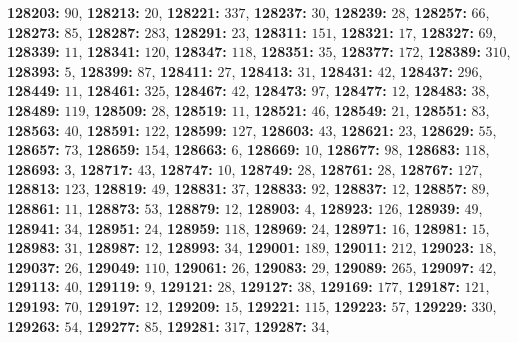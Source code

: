 \textsf{\bfseries 128203:} $90$, \textsf{\bfseries 128213:} $20$, \textsf{\bfseries 128221:} $337$, \textsf{\bfseries 128237:} $30$, \textsf{\bfseries 128239:} $28$, \textsf{\bfseries 128257:} $66$, \textsf{\bfseries 128273:} $85$, \textsf{\bfseries 128287:} $283$, \textsf{\bfseries 128291:} $23$, \textsf{\bfseries 128311:} $151$, \textsf{\bfseries 128321:} $17$, \textsf{\bfseries 128327:} $69$, \textsf{\bfseries 128339:} $11$, \textsf{\bfseries 128341:} $120$, \textsf{\bfseries 128347:} $118$, \textsf{\bfseries 128351:} $35$, \textsf{\bfseries 128377:} $172$, \textsf{\bfseries 128389:} $310$, \textsf{\bfseries 128393:} $5$, \textsf{\bfseries 128399:} $87$, \textsf{\bfseries 128411:} $27$, \textsf{\bfseries 128413:} $31$, \textsf{\bfseries 128431:} $42$, \textsf{\bfseries 128437:} $296$, \textsf{\bfseries 128449:} $11$, \textsf{\bfseries 128461:} $325$, \textsf{\bfseries 128467:} $42$, \textsf{\bfseries 128473:} $97$, \textsf{\bfseries 128477:} $12$, \textsf{\bfseries 128483:} $38$, \textsf{\bfseries 128489:} $119$, \textsf{\bfseries 128509:} $28$, \textsf{\bfseries 128519:} $11$, \textsf{\bfseries 128521:} $46$, \textsf{\bfseries 128549:} $21$, \textsf{\bfseries 128551:} $83$, \textsf{\bfseries 128563:} $40$, \textsf{\bfseries 128591:} $122$, \textsf{\bfseries 128599:} $127$, \textsf{\bfseries 128603:} $43$, \textsf{\bfseries 128621:} $23$, \textsf{\bfseries 128629:} $55$, \textsf{\bfseries 128657:} $73$, \textsf{\bfseries 128659:} $154$, \textsf{\bfseries 128663:} $6$, \textsf{\bfseries 128669:} $10$, \textsf{\bfseries 128677:} $98$, \textsf{\bfseries 128683:} $118$, \textsf{\bfseries 128693:} $3$, \textsf{\bfseries 128717:} $43$, \textsf{\bfseries 128747:} $10$, \textsf{\bfseries 128749:} $28$, \textsf{\bfseries 128761:} $28$, \textsf{\bfseries 128767:} $127$, \textsf{\bfseries 128813:} $123$, \textsf{\bfseries 128819:} $49$, \textsf{\bfseries 128831:} $37$, \textsf{\bfseries 128833:} $92$, \textsf{\bfseries 128837:} $12$, \textsf{\bfseries 128857:} $89$, \textsf{\bfseries 128861:} $11$, \textsf{\bfseries 128873:} $53$, \textsf{\bfseries 128879:} $12$, \textsf{\bfseries 128903:} $4$, \textsf{\bfseries 128923:} $126$, \textsf{\bfseries 128939:} $49$, \textsf{\bfseries 128941:} $34$, \textsf{\bfseries 128951:} $24$, \textsf{\bfseries 128959:} $118$, \textsf{\bfseries 128969:} $24$, \textsf{\bfseries 128971:} $16$, \textsf{\bfseries 128981:} $15$, \textsf{\bfseries 128983:} $31$, \textsf{\bfseries 128987:} $12$, \textsf{\bfseries 128993:} $34$, \textsf{\bfseries 129001:} $189$, \textsf{\bfseries 129011:} $212$, \textsf{\bfseries 129023:} $18$, \textsf{\bfseries 129037:} $26$, \textsf{\bfseries 129049:} $110$, \textsf{\bfseries 129061:} $26$, \textsf{\bfseries 129083:} $29$, \textsf{\bfseries 129089:} $265$, \textsf{\bfseries 129097:} $42$, \textsf{\bfseries 129113:} $40$, \textsf{\bfseries 129119:} $9$, \textsf{\bfseries 129121:} $28$, \textsf{\bfseries 129127:} $38$, \textsf{\bfseries 129169:} $177$, \textsf{\bfseries 129187:} $121$, \textsf{\bfseries 129193:} $70$, \textsf{\bfseries 129197:} $12$, \textsf{\bfseries 129209:} $15$, \textsf{\bfseries 129221:} $115$, \textsf{\bfseries 129223:} $57$, \textsf{\bfseries 129229:} $330$, \textsf{\bfseries 129263:} $54$, \textsf{\bfseries 129277:} $85$, \textsf{\bfseries 129281:} $317$, \textsf{\bfseries 129287:} $34$, 
